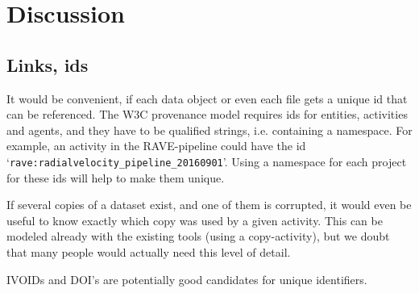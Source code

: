 \section{Discussion}

\subsection{Links, ids}\label{sec:links_between_data}
It would be convenient, if each data object or even each file 
gets a unique id that can be referenced. The W3C provenance model requires ids
for entities, activities and agents, and they have to be qualified strings, 
i.e. containing a namespace. For example, an activity in the RAVE-pipeline could 
have the id `\texttt{rave:radialvelocity\_pipeline\_20160901}'. Using a namespace for each 
project for these ids will help to make them unique. 

If several copies of a dataset exist, and one of them is corrupted, it would even be useful to know
exactly which copy was used by a given activity. This can be modeled already 
with the existing tools (using a copy-activity), but we doubt that many people
would actually need this level of detail.

IVOIDs and DOI's are potentially good candidates for unique identifiers.





